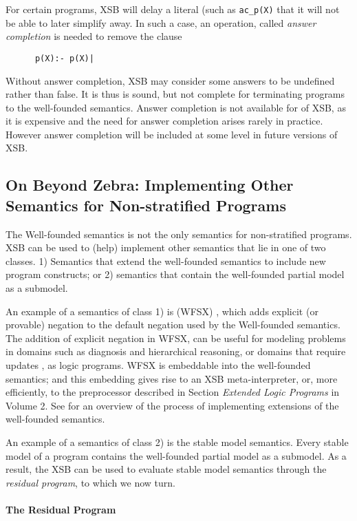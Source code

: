 For certain programs, XSB will delay a literal (such as {\tt ac\_p(X)}
that it will not be able to later simplify away.  In such a case, an
operation, called {\em answer completion} is needed to remove the
clause
\begin{verbatim}
      p(X):- p(X)|
\end{verbatim}
Without answer completion, XSB may consider some answers to be
undefined rather than false.  It is thus is sound, but not complete
for terminating programs to the well-founded semantics.  Answer
completion is not available for \version{} of XSB, as it is expensive
and the need for answer completion arises rarely in practice.  However
answer completion will be included at some level in future versions of
XSB.

\subsection{On Beyond Zebra: Implementing Other Semantics for
Non-stratified Programs}

The Well-founded semantics is not the only semantics for
non-stratified programs.  XSB can be used to (help) implement other
semantics that lie in one of two classes.  1) Semantics that extend
the well-founded semantics to include new program constructs; or 2)
semantics that contain the well-founded partial model as a submodel.

An example of a semantics of class 1) is (WFSX) \cite{ADP95}, which
adds explicit (or provable) negation to the default negation used by
the Well-founded semantics.  The addition of explicit negation in
WFSX, can be useful for modeling problems in domains such as diagnosis
and hierarchical reasoning, or domains that require updates
\cite{Leit97}, as logic programs.  WFSX is embeddable into the
well-founded semantics; and this embedding gives rise to an XSB
meta-interpreter, or, more efficiently, to the preprocessor described
in Section {\it Extended Logic Programs} in Volume 2.  See
\cite{Swif99a} for an overview of the process of implementing
extensions of the well-founded semantics.

An example of a semantics of class 2) is the stable model semantics.
Every stable model of a program contains the well-founded partial
model as a submodel.  As a result, the XSB can be used to evaluate
stable model semantics through the {\em residual program}, to which we
now turn.

\paragraph*{The Residual Program}

